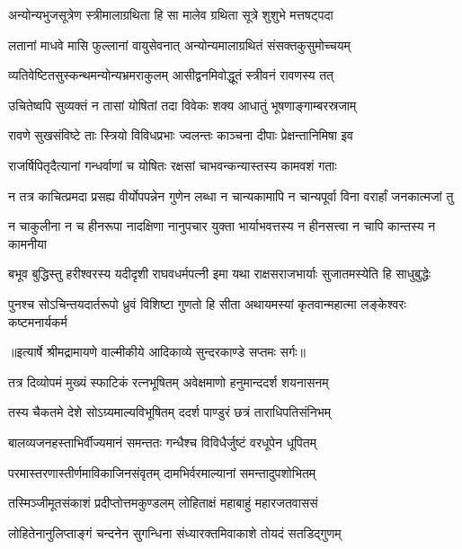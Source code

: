 \twolineshloka
{अन्योन्यभुजसूत्रेण स्त्रीमालाग्रथिता हि सा}
{मालेव ग्रथिता सूत्रे शुशुभे मत्तषट्पदा} %

\twolineshloka
{लतानां माधवे मासि फुल्लानां वायुसेवनात्}
{अन्योन्यमालाग्रथितं संसक्तकुसुमोच्चयम्} %

\twolineshloka
{व्यतिवेष्टितसुस्कन्थमन्योन्यभ्रमराकुलम्}
{आसीद्वनमिवोद्धूतं स्त्रीवनं रावणस्य तत्} %

\twolineshloka
{उचितेष्वपि सुव्यक्तं न तासां योषितां तदा}
{विवेकः शक्य आधातुं भूषणाङ्गाम्बरस्रजाम्} %

\twolineshloka
{रावणे सुखसंविष्टे ताः स्त्रियो विविधप्रभाः}
{ज्वलन्तः काञ्चना दीपाः प्रेक्षन्तानिमिषा इव} %

\twolineshloka
{राजर्षिपितृदैत्यानां गन्धर्वाणां च योषितः}
{रक्षसां चाभवन्कन्यास्तस्य कामवशं गताः} %

\fourlineindentedshloka
{न तत्र काचित्प्रमदा प्रसह्य}
{ वीर्योपपन्नेन गुणेन लब्धा}
{न चान्यकामापि न चान्यपूर्वा}
{ विना वरार्हां जनकात्मजां तु} %

\fourlineindentedshloka
{न चाकुलीना न च हीनरूपा}
{ नादक्षिणा नानुपचार युक्ता}
{भार्याभवत्तस्य न हीनसत्त्वा}
{ न चापि कान्तस्य न कामनीया} %

\fourlineindentedshloka
{बभूव बुद्धिस्तु हरीश्वरस्य}
{ यदीदृशी राघवधर्मपत्नी}
{इमा यथा राक्षसराजभार्याः}
{ सुजातमस्येति हि साधुबुद्धेः} %

\fourlineindentedshloka
{पुनश्च सोऽचिन्तयदार्तरूपो}
{ ध्रुवं विशिष्टा गुणतो हि सीता}
{अथायमस्यां कृतवान्महात्मा}
{ लङ्केश्वरः कष्टमनार्यकर्म} %


{॥इत्यार्षे श्रीमद्रामायणे वाल्मीकीये आदिकाव्ये सुन्दरकाण्डे सप्तमः सर्गः॥}


\twolineshloka
{तत्र दिव्योपमं मुख्यं स्फाटिकं रत्नभूषितम्}
{अवेक्षमाणो हनुमान्ददर्श शयनासनम्} %

\twolineshloka
{तस्य चैकतमे देशे सोऽग्र्यमाल्यविभूषितम्}
{ददर्श पाण्डुरं छत्रं ताराधिपतिसंनिभम्} %

\twolineshloka
{बालव्यजनहस्ताभिर्वीज्यमानं समन्ततः}
{गन्धैश्च विविधैर्जुष्टं वरधूपेन धूपितम्} %

\twolineshloka
{परमास्तरणास्तीर्णमाविकाजिनसंवृतम्}
{दामभिर्वरमाल्यानां समन्तादुपशोभितम्} %

\twolineshloka
{तस्मिञ्जीमूतसंकाशं प्रदीप्तोत्तमकुण्डलम्}
{लोहिताक्षं महाबाहुं महारजतवाससं} %

\twolineshloka
{लोहितेनानुलिप्ताङ्गं चन्दनेन सुगन्धिना}
{संध्यारक्तमिवाकाशे तोयदं सतडिद्गुणम्} %

